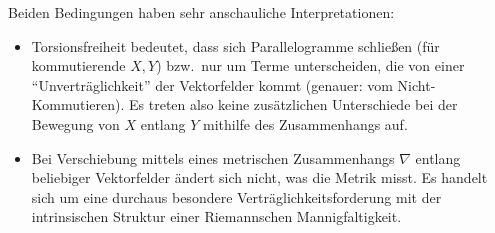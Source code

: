 Beiden Bedingungen haben sehr anschauliche Interpretationen:
\begin{itemize}
\item Torsionsfreiheit bedeutet, dass sich Parallelogramme schließen (für kommutierende $X, Y$) bzw.~nur um Terme unterscheiden, die von einer \enquote{Unverträglichkeit} der Vektorfelder kommt (genauer: vom Nicht-Kommutieren). Es treten also keine zusätzlichen Unterschiede bei der Bewegung von $X$ entlang $Y$ mithilfe des Zusammenhangs auf.%

\item Bei Verschiebung mittels eines metrischen Zusammenhangs $\nabla$ entlang beliebiger Vektorfelder ändert sich nicht, was die Metrik misst. Es handelt sich um eine durchaus besondere Verträglichkeitsforderung mit der intrinsischen Struktur einer Riemannschen Mannigfaltigkeit.
\end{itemize}



